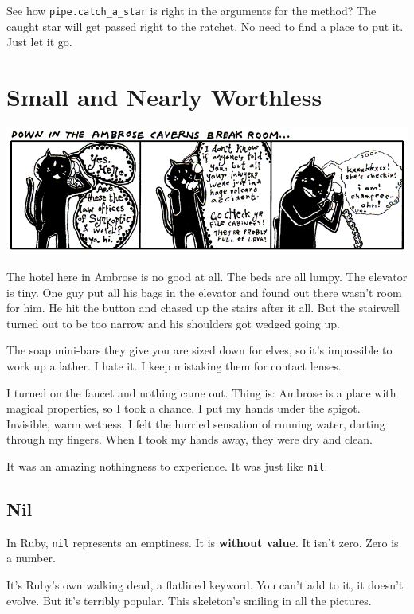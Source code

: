 \documentclass[10pt,twoside]{report}
\begin{document}
See how \lstinline[breaklines=true]|pipe.catch_a_star| is right in the
arguments for the method?  The caught star will get passed right to
the ratchet.  No need to find a place to put it.  Just let it go.


\section{Small and Nearly Worthless}


	\includegraphics[width=1.0\textwidth]{cache/27.png}

The hotel here in Ambrose is no good at all.  The beds are all
lumpy. The elevator is tiny.  One guy put all his bags in the elevator
and found out there wasn't room for him.  He hit the button and chased
up the stairs after it all.  But the stairwell turned out to be too
narrow and his shoulders got wedged going up.

The soap mini-bars they give you are sized down for elves, so it's
impossible to work up a lather.  I hate it.  I keep mistaking them for
contact lenses.

I turned on the faucet and nothing came out.  Thing is: Ambrose is a
place with magical properties, so I took a chance.  I put my hands
under the spigot.  Invisible, warm wetness.  I felt the hurried
sensation of running water, darting through my fingers.  When I took
my hands away, they were dry and clean.

It was an amazing nothingness to experience.  It was just like
\lstinline[breaklines=true]|nil|.



\subsection{Nil}



In Ruby, \lstinline[breaklines=true]|nil| represents an emptiness.  It
is {\bf without value}.  It isn't zero. Zero is a number.

It's Ruby's own walking dead, a flatlined keyword.  You can't add to
it, it doesn't evolve.  But it's terribly popular.  This skeleton's
smiling in all the pictures.
\end{document}
